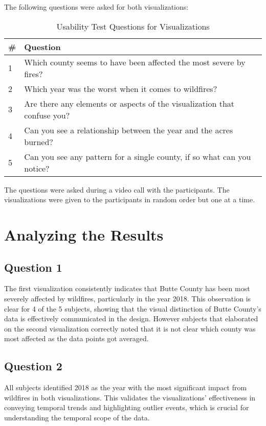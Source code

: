 The following questions were asked for both visualizations:
\begin{table}[H]
    \centering
    \begin{tabular}{|l|p{}|}
    \hline
    \textbf{\#} & \textbf{Question} \\ \hline
    1           & Which county seems to have been affected the most severe by fires? \\ \hline
    2           & Which year was the worst when it comes to wildfires? \\ \hline
    3           & Are there any elements or aspects of the visualization that confuse you? \\ \hline
    4           & Can you see a relationship between the year and the acres burned? \\ \hline
    5           & Can you see any pattern for a single county, if so what can you notice? \\ \hline
    \end{tabular}
    \caption{Usability Test Questions for Visualizations}
\end{table}

The questions were asked during a video call with the participants. The visualizations were given 
to the participants in random order but one at a time.

\section*{Analyzing the Results}
\subsection*{Question 1}
The first visualization consistently indicates that Butte County has been most severely affected by 
wildfires, particularly in the year 2018. This observation is clear for 4 of the 5 subjects, 
showing that the visual distinction of Butte County's data is effectively communicated in the design.
However subjects that elaborated on the second visualization correctly noted that it is not clear which 
county was most affected as the data points got averaged.

\subsection*{Question 2}
All subjects identified 2018 as the year with the most significant impact from wildfires in both visualizations.
This validates the visualizations' effectiveness in conveying temporal trends and highlighting outlier 
events, which is crucial for understanding the temporal scope of the data.

